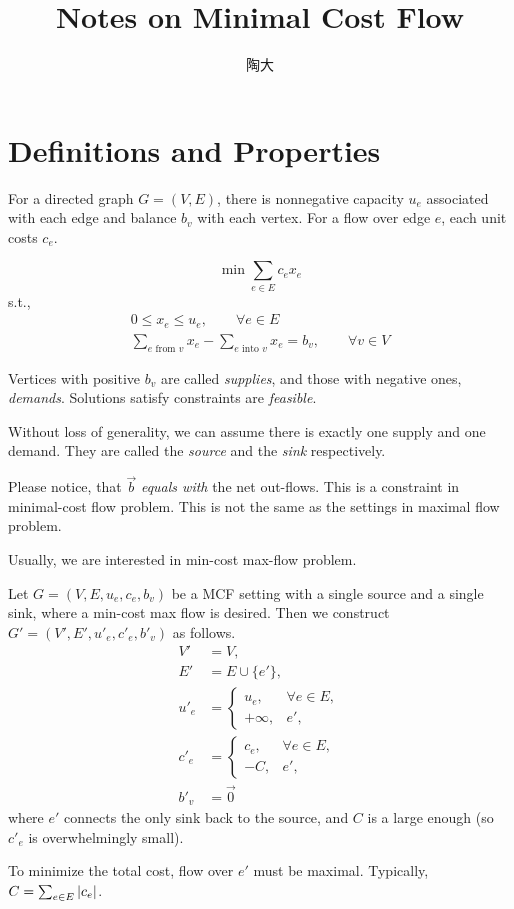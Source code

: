 \documentclass[UTF8,a4paper]{ctexart}
\title{Notes on Minimal Cost Flow}
\author{陶大}
\begin{document}
\maketitle
\tableofcontents

\section{Definitions and Properties}

For a directed graph $G=(V, E)$, there is nonnegative capacity $u_e$ associated with each edge
and balance $b_v$ with each vertex.
For a flow over edge $e$, each unit costs $c_e$.

\[
    \min \sum_{e\in E} c_e x_e
\]
s.t.,
\begin{align}
    0\leqslant x_e \leqslant u_e,\qquad \forall e\in E\\
    \sum_{e\text{ from }v} x_e - \sum_{e\text{ into }v} x_e = b_v,\qquad \forall v\in V
\end{align}

Vertices with positive $b_v$ are called \emph{supplies},
and those with negative ones, \emph{demands}.
Solutions satisfy constraints are \emph{feasible}.

Without loss of generality, we can assume there is exactly one supply and one demand.
They are called the \emph{source} and the \emph{sink} respectively.

\begin{remark}
    Please notice, that $\vec{b}$ \emph{equals with} the net out-flows.
    This is a constraint in minimal-cost flow problem.
    This is not the same as the settings in maximal flow problem.
\end{remark}

\begin{remark}
    Usually, we are interested in min-cost max-flow problem.

    Let $G=(V, E, {u_e}, {c_e}, {b_v})$ be a MCF setting with a single source and a single sink,
    where a min-cost max flow is desired.
    Then we construct $G'=(V', E', {u'_e}, {c'_e}, {b'_v})$ as follows.
    \begin{align}
        V'&=V,\\
        E'&=E\cup\{e'\},\\
        u'_e&=\begin{cases}
            u_e,&\forall e\in E,\\
            +\infty,&e',
        \end{cases}\\
        c'_e&=\begin{cases}
            c_e,&\forall e\in E,\\
            -C,&e',
        \end{cases}\\
        b'_v&=\vec{0}
    \end{align}
    where $e'$ connects the only sink back to the source,
    and $C$ is a large enough (so $c'_e$ is overwhelmingly small).

    To minimize the total cost, flow over $e'$ must be maximal.
    Typically, $C=\sum_{e\in E}\left| c_e \right|$.
\end{remark}
\end{document}
